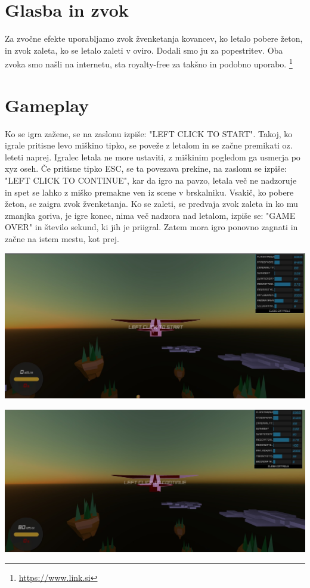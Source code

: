 \documentclass[a4paper]{article}
\begin{document}
\section{Glasba in zvok}%
Za zvočne efekte uporabljamo zvok žvenketanja kovancev, ko letalo pobere žeton, in zvok zaleta, ko se letalo zaleti v oviro. Dodali smo ju za popestritev. Oba zvoka smo našli na internetu, sta royalty-free za takšno in podobno uporabo. \footnote{\url{https://www.link.si}}

\section{Gameplay}%
Ko se igra zažene, se na zaslonu izpiše: "LEFT CLICK TO START". Takoj, ko igrale pritisne levo miškino tipko, se poveže z letalom in se začne premikati oz. leteti naprej. Igralec letala ne more ustaviti, z miškinim pogledom ga usmerja po xyz oseh. Če pritisne tipko ESC, se ta povezava prekine, na zaslonu se izpiše: "LEFT CLICK TO CONTINUE", kar da igro na pavzo, letala več ne nadzoruje in spet se lahko z miško premakne ven iz scene v brskalniku. Vsakič, ko pobere žeton, se zaigra zvok žvenketanja. Ko se zaleti, se predvaja zvok zaleta in ko mu zmanjka goriva, je igre konec, nima več nadzora nad letalom, izpiše se: "GAME OVER" in število sekund, ki jih je priigral. Zatem mora igro ponovno zagnati in začne na istem mestu, kot prej.
\begin{center}
     \includegraphics[width=\columnwidth]{start.jpg}
\end{center}

\begin{center}
     \includegraphics[width=\columnwidth]{continue.jpg}
\end{center}
\end{document}
